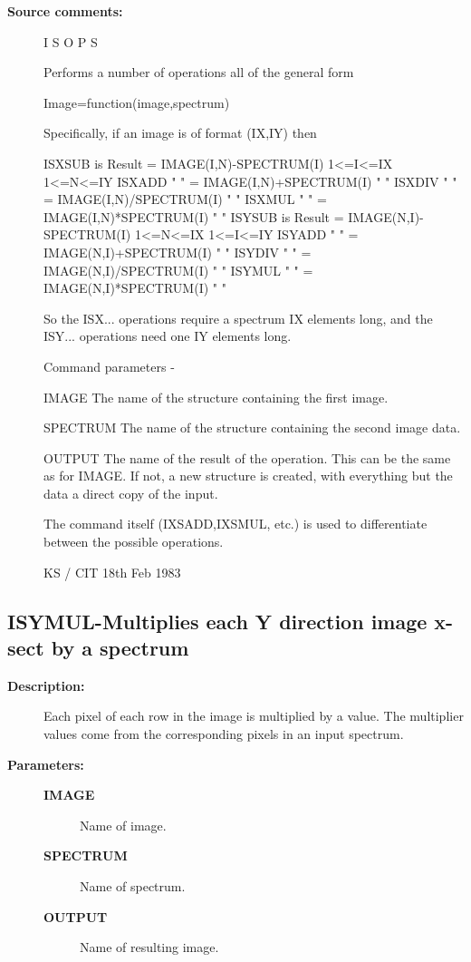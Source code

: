 \begin{description}
\begin{description}
\item [\textbf{Source comments:}]
\begin{terminalv}
 I S O P S

 Performs a number of operations all of the general form

 Image=function(image,spectrum)

 Specifically, if an image is of format (IX,IY) then

 ISXSUB is Result = IMAGE(I,N)-SPECTRUM(I) 1<=I<=IX 1<=N<=IY
 ISXADD  "   "    = IMAGE(I,N)+SPECTRUM(I)    "        "
 ISXDIV  "   "    = IMAGE(I,N)/SPECTRUM(I)    "        "
 ISXMUL  "   "    = IMAGE(I,N)*SPECTRUM(I)    "        "
 ISYSUB is Result = IMAGE(N,I)-SPECTRUM(I) 1<=N<=IX 1<=I<=IY
 ISYADD  "   "    = IMAGE(N,I)+SPECTRUM(I)    "        "
 ISYDIV  "   "    = IMAGE(N,I)/SPECTRUM(I)    "        "
 ISYMUL  "   "    = IMAGE(N,I)*SPECTRUM(I)    "        "

 So the ISX... operations require a spectrum IX elements long,
 and the ISY... operations need one IY elements long.

 Command parameters -

 IMAGE    The name of the structure containing the first image.

 SPECTRUM The name of the structure containing the second
          image data.

 OUTPUT   The name of the result of the operation.  This can
          be the same as for IMAGE.  If not, a new structure
          is created, with everything but the data a direct
          copy of the input.

 The command itself (IXSADD,IXSMUL, etc.) is used to
 differentiate between the possible operations.

                                  KS / CIT 18th Feb 1983
\end{terminalv}
\end{description}
\subsection{ISYMUL-\label{ISYMUL}Multiplies each Y direction image x-sect by a spectrum}
\begin{description}

\item [\textbf{Description:}]
 Each pixel of each row in the image is multiplied by a value.
 The multiplier values come from the corresponding pixels in an
 input spectrum.

\item [\textbf{Parameters:}]
\begin{description}
\item [\textbf{IMAGE}]
 Name of image.
\item [\textbf{SPECTRUM}]
 Name of spectrum.
\item [\textbf{OUTPUT}]
 Name of resulting image.
\end{description}


\end{description}
\end{description}
